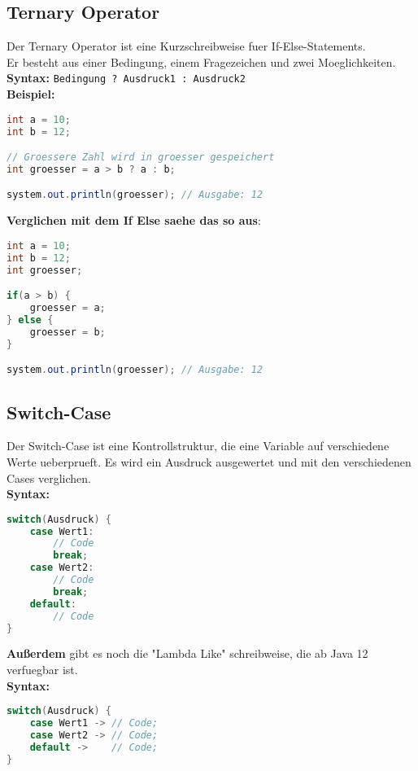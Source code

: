 \documentclass[12pt, a4paper]{article}
\begin{document}
\subsection*{Ternary Operator}
Der Ternary Operator ist eine Kurzschreibweise fuer If-Else-Statements. \\
Er besteht aus einer Bedingung, einem Fragezeichen und zwei Moeglichkeiten. \vspace{0.5cm}\\
\textbf{Syntax:} \texttt{Bedingung ? Ausdruck1 : Ausdruck2} \\
\textbf{Beispiel:}
\begin{lstlisting}[language=java,title=Beispiel:Ternary-Operator]
int a = 10;
int b = 12;

// Groessere Zahl wird in groesser gespeichert
int groesser = a > b ? a : b;

system.out.println(groesser); // Ausgabe: 12
\end{lstlisting}
\textbf{Verglichen mit dem If Else saehe das so aus}: \vspace{0.5cm} 
\begin{lstlisting}[language=java,title=Beispiel:Ternary-Operator]
int a = 10;
int b = 12;
int groesser;

if(a > b) {
    groesser = a;
} else {
    groesser = b;
}

system.out.println(groesser); // Ausgabe: 12
\end{lstlisting}
\newpage
\subsection*{Switch-Case}
Der Switch-Case ist eine Kontrollstruktur, die eine Variable auf verschiedene Werte ueberprueft.
Es wird ein Ausdruck ausgewertet und mit den verschiedenen Cases verglichen. \vspace{0.5cm} \\
\textbf{Syntax:}
\begin{lstlisting}[language=java,title=Syntax:Switch-Case]
switch(Ausdruck) {
    case Wert1:
        // Code
        break;
    case Wert2:
        // Code
        break;
    default:
        // Code
}
\end{lstlisting}
\textbf{Außerdem} gibt es noch die "Lambda Like" schreibweise, die ab Java 12 verfuegbar ist. \vspace{0.5cm} \\
\textbf{Syntax:}
\begin{lstlisting}[language=java,title=Syntax:Switch-Case]
switch(Ausdruck) {
    case Wert1 -> // Code;
    case Wert2 -> // Code;
    default ->    // Code;
}
\end{lstlisting}
\newpage
\end{document}
